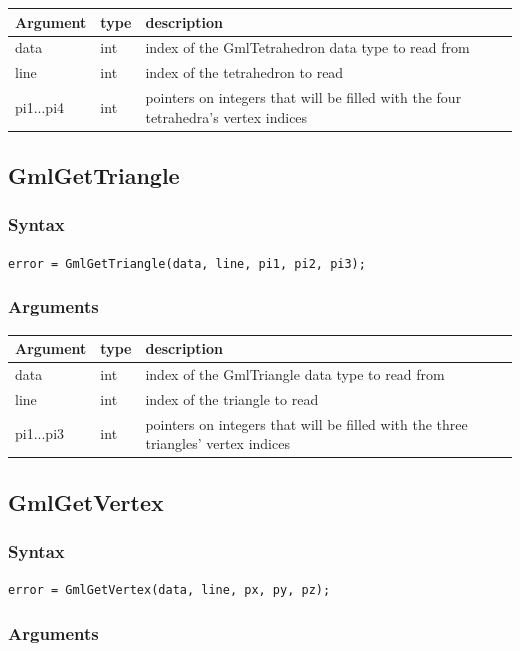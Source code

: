 \documentclass[a4paper,12pt]{article}
\begin{document}
\begin{tabular}{|m{2cm}|m{1.5cm}|m{10.5cm}|}
\hline
Argument   & type   & description \\
\hline
data       & int    & index of the GmlTetrahedron data type to read from \\
\hline
line       & int    & index of the tetrahedron to read \\
\hline
pi1...pi4  & int    & pointers on integers that will be filled with the four tetrahedra's vertex indices \\
\hline
\end{tabular}


\subsection{GmlGetTriangle}
\subsubsection*{Syntax}
{\tt error = GmlGetTriangle(data, line, pi1, pi2, pi3);}
\subsubsection*{Arguments}

\begin{tabular}{|m{2cm}|m{1.5cm}|m{10.5cm}|}
\hline
Argument   & type   & description \\
\hline
data       & int    & index of the GmlTriangle data type to read from \\
\hline
line       & int    & index of the triangle to read \\
\hline
pi1...pi3  & int    & pointers on integers that will be filled with the three triangles' vertex indices \\
\hline
\end{tabular}


\subsection{GmlGetVertex}
\subsubsection*{Syntax}
{\tt error = GmlGetVertex(data, line, px, py, pz);}
\subsubsection*{Arguments}
\end{document}
